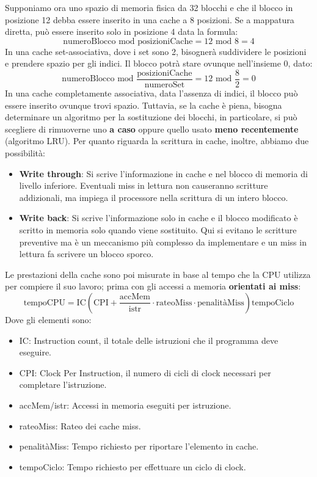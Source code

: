 \noindent Supponiamo ora uno spazio di memoria fisica da 32 blocchi e che il blocco in posizione 12 debba essere inserito in una cache a 8 posizioni.
Se a mappatura diretta, può essere inserito solo in posizione 4 data la formula: \[
    \text{numeroBlocco} \text{ mod } \text{posizioniCache} = 12 \text{ mod } 8 = 4
\]
\noindent In una cache set-associativa, dove i set sono 2, bisognerà suddividere le posizioni e prendere spazio per gli indici. Il blocco potrà stare
ovunque nell'insieme 0, dato: \[
    \text{numeroBlocco} \text{ mod } \frac{\text{posizioniCache}}{\text{numeroSet}} = 12 \text{ mod } \frac{8}{2} = 0
\]
\noindent In una cache completamente associativa, data l'assenza di indici, il blocco può essere inserito ovunque trovi spazio. Tuttavia, se la cache è
piena, bisogna determinare un algoritmo per la sostituzione dei blocchi, in particolare, si può scegliere di rimuoverne uno \textbf{a caso} oppure
quello usato \textbf{meno recentemente} (algoritmo LRU). Per quanto riguarda la scrittura in cache, inoltre, abbiamo due possibilità: \begin{itemize}
    \item \textbf{Write through}: Si scrive l'informazione in cache e nel blocco di memoria di livello inferiore. Eventuali miss in lettura non
    causeranno scritture addizionali, ma impiega il processore nella scrittura di un intero blocco.
    \item \textbf{Write back}: Si scrive l'informazione solo in cache e il blocco modificato è scritto in memoria solo quando viene sostituito. Qui si
    evitano le scritture preventive ma è un meccanismo più complesso da implementare e un miss in lettura fa scrivere un blocco sporco.
\end{itemize}

\noindent Le prestazioni della cache sono poi misurate in base al tempo che la CPU utilizza per compiere il suo lavoro; prima con gli accessi a memoria
\textbf{orientati ai miss}: \[
    \text{tempoCPU} = \text{IC}\left(
        \text{CPI} + \frac{\text{accMem}}{\text{istr}}\cdot \text{rateoMiss}\cdot \text{penalitàMiss}
        \right) \text{tempoCiclo}
\]
\noindent Dove gli elementi sono: \begin{itemize}
    \item IC: Instruction count, il totale delle istruzioni che il programma deve eseguire.
    \item CPI: Clock Per Instruction, il numero di cicli di clock necessari per completare l'istruzione.
    \item accMem/istr: Accessi in memoria eseguiti per istruzione.
    \item rateoMiss: Rateo dei cache miss.
    \item penalitàMiss: Tempo richiesto per riportare l'elemento in cache.
    \item tempoCiclo: Tempo richiesto per effettuare un ciclo di clock.
\end{itemize}

